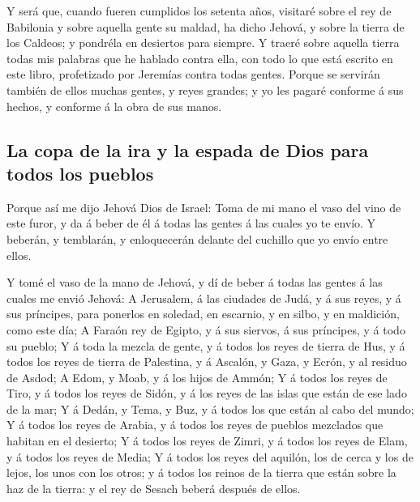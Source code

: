  Y será que, cuando fueren cumplidos los setenta años,
visitaré sobre el rey de Babilonia y sobre aquella gente su maldad, ha
dicho Jehová, y sobre la tierra de los Caldeos; y pondréla en desiertos
para siempre.  Y traeré sobre aquella tierra todas mis
palabras que he hablado contra ella, con todo lo que está escrito en
este libro, profetizado por Jeremías contra todas gentes. 
Porque se servirán también de ellos muchas gentes, y reyes grandes; y yo
les pagaré conforme á sus hechos, y conforme á la obra de sus manos.

\hypertarget{la-copa-de-la-ira-y-la-espada-de-dios-para-todos-los-pueblos}{%
\subsection{La copa de la ira y la espada de Dios para todos los
pueblos}\label{la-copa-de-la-ira-y-la-espada-de-dios-para-todos-los-pueblos}}

 Porque así me dijo Jehová Dios de Israel: Toma de mi mano
el vaso del vino de este furor, y da á beber de él á todas las gentes á
las cuales yo te envío.  Y beberán, y temblarán, y
enloquecerán delante del cuchillo que yo envío entre ellos.

 Y tomé el vaso de la mano de Jehová, y dí de beber á todas
las gentes á las cuales me envió Jehová:  A Jerusalem, á
las ciudades de Judá, y á sus reyes, y á sus príncipes, para ponerlos en
soledad, en escarnio, y en silbo, y en maldición, como este día;
 A Faraón rey de Egipto, y á sus siervos, á sus príncipes,
y á todo su pueblo;  Y á toda la mezcla de gente, y á todos
los reyes de tierra de Hus, y á todos los reyes de tierra de Palestina,
y á Ascalón, y Gaza, y Ecrón, y al residuo de Asdod;  A
Edom, y Moab, y á los hijos de Ammón;  Y á todos los reyes
de Tiro, y á todos los reyes de Sidón, y á los reyes de las islas que
están de ese lado de la mar;  Y á Dedán, y Tema, y Buz, y á
todos los que están al cabo del mundo;  Y á todos los reyes
de Arabia, y á todos los reyes de pueblos mezclados que habitan en el
desierto;  Y á todos los reyes de Zimri, y á todos los
reyes de Elam, y á todos los reyes de Media;  Y á todos los
reyes del aquilón, los de cerca y los de lejos, los unos con los otros;
y á todos los reinos de la tierra que están sobre la haz de la tierra: y
el rey de Sesach beberá después de ellos.


